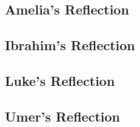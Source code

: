 \documentclass[11pt]{article}
\begin{document}
\subsection{Amelia's Reflection}
\subsection{Ibrahim's Reflection}
\subsection{Luke's Reflection}
\subsection{Umer's Reflection}
\end{document}
